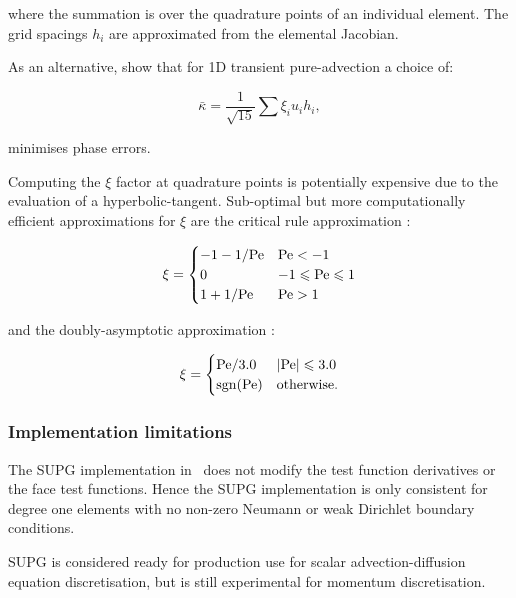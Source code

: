 where the summation is over the quadrature points of an individual element. The
grid spacings $h_i$ are approximated from the elemental Jacobian.

As an alternative, \citet{raymond1976} show that for
1D transient pure-advection a choice of:

\begin{equation}\label{eqn:md_nu_bar_transient}
  \bar{\kappa} = \frac{1}{\sqrt{15}} \sum{\xi_i u_i h_i},
\end{equation}

minimises phase errors.

Computing the $\xi$ factor at quadrature points is potentially expensive due to
the evaluation of a hyperbolic-tangent. Sub-optimal but more computationally
efficient approximations for $\xi$ are the critical rule approximation \citep{brooks1982}:

\begin{equation}
  \xi = \begin{cases}
          -1 - 1 / \mathrm{Pe}  & \mathrm{Pe} < -1 \\
          0             & -1 \leqslant \mathrm{Pe} \leqslant 1 \\
          1 + 1 / \mathrm{Pe}   & \mathrm{Pe} > 1
        \end{cases}
\end{equation}

and the doubly-asymptotic approximation \citep{DoneaBook}:

\begin{equation}
  \xi = \begin{cases}
          \mathrm{Pe} / 3.0  & \left| \mathrm{Pe} \right| \leqslant 3.0 \\
          \operatorname{sgn}(\mathrm{Pe})  & \textrm{otherwise}.
        \end{cases}
\end{equation}

\subsubsection{Implementation limitations}

The SUPG implementation in \fluidity\ does not modify the test function derivatives
or the face test functions. Hence the SUPG implementation is only consistent
for degree one elements with no non-zero Neumann or weak Dirichlet boundary
conditions.

SUPG is considered ready for production use for scalar advection-diffusion
equation discretisation, but is still experimental for momentum discretisation.

